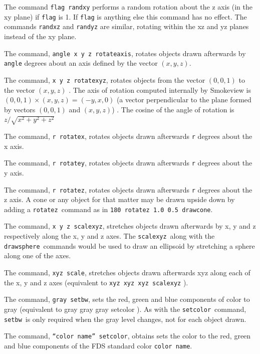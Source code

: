 \documentclass[11pt,twoside]{book}
\newcommand{\hitem}[1]{\item[{\bf #1} \hfill]}
\begin{document}
\hitem{randxy, randxz, randyz} The command {\tt flag randxy} performs a random rotation about the z axis (in the xy plane) if
{\tt flag} is 1. If {\tt flag} is anything else this command has no effect. The commands {\tt randxz} and {\tt randyz} are similar,
rotating within the xz and yz planes instead of the xy plane.

\hitem{rotateaxis} The command, {\tt angle x y z rotateaxis}, rotates objects drawn afterwards by {\tt angle} degrees about an
axis defined by the vector $(x,y,z)$.

\hitem{rotatexyz} The command, {\tt x y z rotatexyz}, rotates objects from the vector $(0,0,1)$ to the vector $(x,y,z)$ .  The
axis of rotation computed internally by Smokeview is $(0,0,1)\times (x,y,z)=(-y,x,0)$ (a vector perpendicular to the plane formed by vectors $(0,0,1)$ and $(x,y,z)$) . The cosine of the angle of rotation is $z/\sqrt{x^2+y^2+z^2}$

\hitem{rotatex} The command, {\tt r rotatex}, rotates objects drawn afterwards {\tt r} degrees about the x axis.

\hitem{rotatey} The command, {\tt r rotatey}, rotates objects drawn afterwards {\tt r} degrees about the y axis.

\hitem{rotatez} The command, {\tt r rotatez}, rotates objects drawn afterwards {\tt r} degrees about the z axis.  A cone or any
object for that matter may be drawn upside down by adding a {\tt rotatez}\ command as in {\tt 180 rotatez 1.0 0.5 drawcone}.

\hitem{scalexyz} The command, {\tt x y z scalexyz}, stretches objects drawn afterwards by x, y and z respectively along the x, y
and z axes. The {\tt scalexyz}\ along with the {\tt drawsphere}\ commands would be used to draw an ellipsoid by stretching a sphere
along one of the axes.

\hitem{scale} The command, {\tt xyz scale}, stretches objects drawn afterwards xyz along each of the x, y and z axes (equivalent
to {\tt xyz xyz xyz scalexyz} ).

\hitem{setbw} The command, {\tt gray setbw}, sets the red, green and blue components of color to gray (equivalent to gray gray gray
setcolor ).  As with the {\tt setcolor}\ command, {\tt setbw}\ is only required when the gray level changes, not for each object drawn.

\hitem{setcolor} The command, {\tt ``color name'' setcolor}, obtains sets the color to the red, green and blue components of
the FDS standard color {\tt color~name}.
\end{document}

